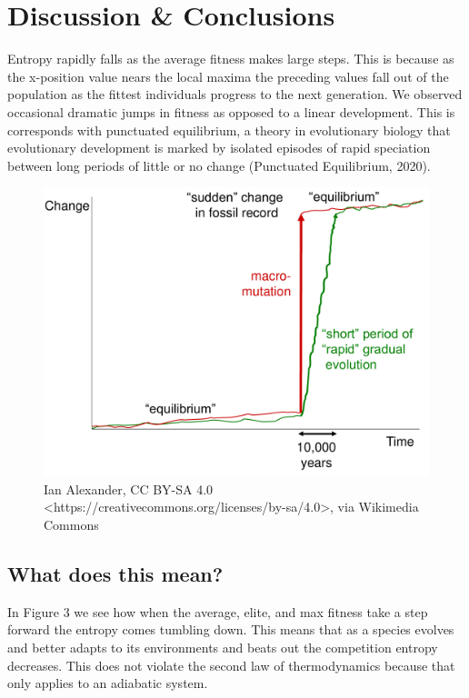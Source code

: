 \documentclass[11pt]{article}
\begin{document}
\section{Discussion \& Conclusions}
\label{sec:org7999995}
Entropy rapidly falls as the average fitness makes large steps. This is because as the x-position value nears the local maxima the preceding values fall out of the population as the fittest individuals progress to the next generation. We observed occasional dramatic jumps in fitness as opposed to a linear development. This is corresponds with punctuated equilibrium, a theory in evolutionary biology that evolutionary development is marked by isolated episodes of rapid speciation between long periods of little or no change (Punctuated Equilibrium, 2020).
\begin{figure}[h]
	\begin{center}
	\includegraphics[scale=0.25]{Punctuated_Equilibrium.pdf}
	\caption{
		\small Ian Alexander, CC BY-SA 4.0 <https://creativecommons.org/licenses/by-sa/4.0>, via Wikimedia Commons
	}
\end{center}
\end{figure}

\subsection{What does this mean?}
\label{sec😮rgf7b36ed}
In Figure 3 we see how when the average, elite, and max fitness take a step forward the entropy comes tumbling down. This means that as a species evolves and better adapts to its environments and beats out the competition entropy decreases. This does not violate the second law of thermodynamics because that only applies to an adiabatic system.
\end{document}
